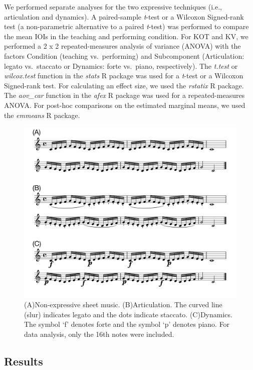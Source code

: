 \documentclass[
  man,floatsintext]{apa6}
\begin{document}
We performed separate analyses for the two expressive techniques (i.e., articulation and dynamics). A paired-sample \emph{t}-test or a Wilcoxon Signed-rank test (a non-parametric alternative to a paired \emph{t}-test) was performed to compare the mean IOIs in the teaching and performing condition. For KOT and KV, we performed a 2 x 2 repeated-measures analysis of variance (ANOVA) with the factors Condition (teaching vs.~performing) and Subcomponent (Articulation: legato vs.~staccato or Dynamics: forte vs.~piano, respectively). The \emph{t.test} or \emph{wilcox.test} function in the \emph{stats} R package was used for a \emph{t}-test or a Wilcoxon Signed-rank test. For calculating an effect size, we used the \emph{rstatix} R package. The \emph{aov\_car} function in the \emph{afex} R package was used for a repeated-measures ANOVA. For post-hoc comparisons on the estimated marginal means, we used the \emph{emmeans} R package.

\begin{figure}
\includegraphics[width=1\linewidth]{manuscript_files/figure-latex/stim-1-1} \caption{\label{fig:stimuli}(A)Non-expressive sheet music. (B)Articulation. The curved line (slur) indicates legato and the dots indicate staccato. (C)Dynamics. The symbol `f' denotes forte and the symbol `p' denotes piano. For data analysis, only the 16th notes were included.}\label{fig:stim-1}
\end{figure}

\newpage

\hypertarget{results}{%
\subsection{Results}\label{results}}
\end{document}
